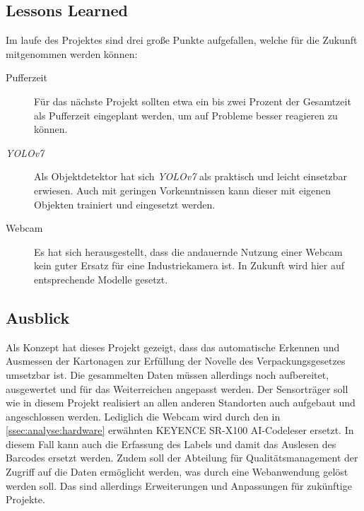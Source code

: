 \subsection{Lessons Learned}

Im laufe des Projektes sind drei große Punkte aufgefallen, welche für die Zukunft mitgenommen werden können:

\begin{description}
  \item[Pufferzeit] Für das nächste Projekt sollten etwa ein bis zwei Prozent der Gesamtzeit als Pufferzeit eingeplant werden, um auf Probleme besser reagieren zu können.
  \item[\textit{\gls{YOLOv7}}] Als Objektdetektor hat sich \textit{\gls{YOLOv7}} als praktisch und leicht einsetzbar erwiesen. Auch mit geringen Vorkenntnissen kann dieser mit eigenen Objekten trainiert und eingesetzt werden.
  \item[Webcam] Es hat sich herausgestellt, dass die andauernde Nutzung einer Webcam kein guter Ersatz für eine Industriekamera ist. In Zukunft wird hier auf entsprechende Modelle gesetzt.
\end{description}


\subsection{Ausblick}\label{ssec:ausblick}

Als Konzept hat dieses Projekt gezeigt, dass das automatische Erkennen und Ausmessen der Kartonagen zur Erfüllung der Novelle des Verpackungsgesetzes umsetzbar ist. Die gesammelten Daten müssen allerdings noch aufbereitet, ausgewertet und für das Weiterreichen angepasst werden. Der Sensorträger soll wie in diesem Projekt realisiert an allen anderen Standorten auch aufgebaut und angeschlossen werden. Lediglich die Webcam wird durch den in \vref{ssec:analyse:hardware} erwähnten KEYENCE SR-X100 AI-Codeleser ersetzt. In diesem Fall kann auch die Erfassung des Labels und damit das Auslesen des Barcodes ersetzt werden. Zudem soll der Abteilung für Qualitätsmanagement der Zugriff auf die Daten ermöglicht werden, was durch eine Webanwendung gelöst werden soll. Das sind allerdings Erweiterungen und Anpassungen für zukünftige Projekte.